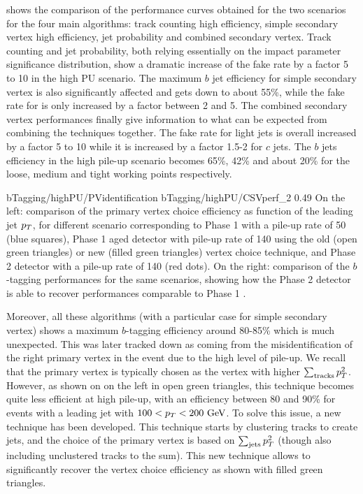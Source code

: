      shows the comparison of the performance curves
    obtained for the two scenarios for the four main algorithms: track counting high
    efficiency, simple secondary vertex high efficiency, jet probability and combined secondary vertex.
    Track counting and jet probability, both relying essentially on the impact parameter
    significance distribution, show a dramatic increase of the fake rate by a factor
    5 to 10 in the high PU scenario. The maximum $b$ jet efficiency for simple secondary
    vertex is also significantly affected and gets down to about 55\%, while the fake rate
    for is only increased by a factor between 2 and 5. The combined secondary vertex
    performances finally give information to what can be expected from combining the
    techniques together. The fake rate for light jets is overall increased by a factor 5
    to 10 while it is increased by a factor 1.5-2 for $c$ jets. The $b$ jets efficiency in
    the high pile-up scenario becomes 65\%, 42\% and about 20\% for the loose, medium and
    tight working points respectively.

                     {bTagging/highPU/PVidentification}
                     {bTagging/highPU/CSVperf_2}
                     {0.49}
                     {On the left: comparison of the primary vertex choice efficiency as function of the
                     leading jet $p_T$, for different scenario corresponding to Phase 1
                     with a pile-up rate of 50 (blue squares),
                     Phase 1 aged detector with pile-up rate of 140 using the old (open
                     green triangles) or new (filled green triangles) vertex choice
                     technique, and Phase 2 detector with a pile-up rate of 140 (red dots).
                     On the right: comparison of the $b$-tagging performances for the same
                     scenarios, showing how the Phase 2 detector is able to recover performances
                     comparable to Phase 1 \cite{Phase2TDR}.}

    Moreover, all these algorithms (with a particular case for simple secondary vertex)
    shows a maximum $b$-tagging efficiency around 80-85\% which is much unexpected. This
    was later \cite{Phase2TDR} tracked down as coming from the misidentification of the right primary vertex
    in the event due to the high level of pile-up. We recall that the primary vertex
    is typically chosen as the vertex with higher $\sum_\text{tracks} p_T^2$. However,
    as shown on  on the left in open green triangles, this
    technique becomes quite less efficient at high pile-up, with an efficiency between 80 and 90\%
    for events with a leading jet with $100 < p_T < 200 ~\text{GeV}$. To solve this issue, a new
    technique has been developed. This technique starts by clustering tracks to create jets,
    and the choice of the primary vertex is based on $\sum_\text{jets} p_T^2$ (though also
    including unclustered tracks to the sum). This new technique allows to significantly
    recover the vertex choice efficiency as shown with filled green triangles.

